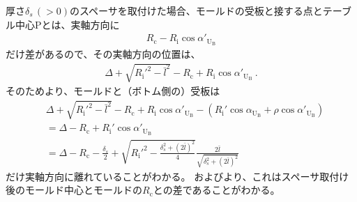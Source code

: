 \clearpage
厚さ$\delta_s\,(>0)$のスペーサを取付けた場合、モールドの受板と接する点とテーブル中心Pとは、実軸方向に
\begin{align*}
  R_\mathrm c-R_\mathrm i\cos\alpha'_{\mathrm U_\mathrm B}
\end{align*}
だけ差があるので、その実軸方向の位置は、
\begin{align*}
  \Delta+\sqrt{R_\mathrm i'^2-\bar l^2}-R_\mathrm c+R_\mathrm i\cos\alpha'_{\mathrm U_\mathrm B}\ .
\end{align*}
そのためより、モールドと（ボトム側の）受板は
\begin{align*}
  &  \Delta+\sqrt{R_\mathrm i'^2-\bar l^2}-R_\mathrm c+R_\mathrm i\cos\alpha'_{\mathrm U_\mathrm B}
     -\left(R_\mathrm i'\cos\alpha_{\mathrm U_\mathrm B}+\rho\cos\alpha'_{\mathrm U_\mathrm B}\right)\\
  &= \Delta-R_\mathrm c+R_\mathrm i'\cos\alpha'_{\mathrm U_\mathrm B}\\
  &= \Delta-R_\mathrm c
     -\frac{\delta_s}2+\sqrt{R_\mathrm i'^2-\frac{\delta_s^2+(2\bar l)^2}4}\frac{2\bar l}{\sqrt{\delta_s^2+(2\bar l)^2}}
\end{align*}
だけ実軸方向に離れていることがわかる。
およびより、これはスペーサ取付け後のモールド中心とモールドの\CenterCurvature$R_\mathrm c$との差であることがわかる。

